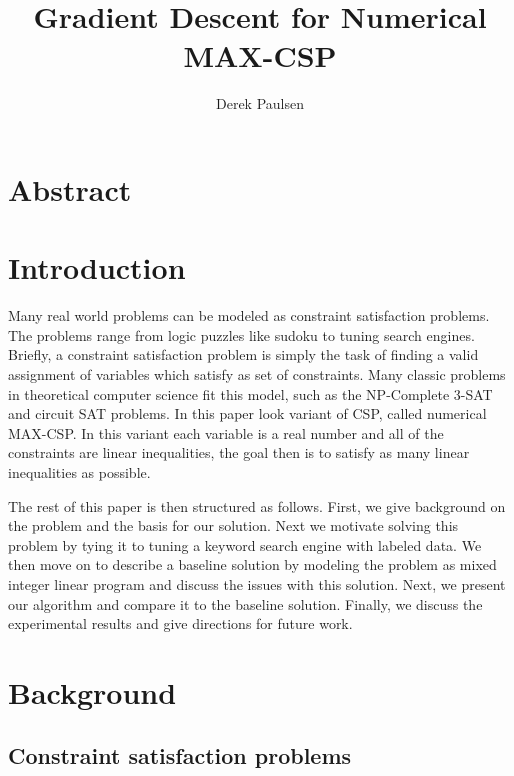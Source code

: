 \documentclass[a4paper]{article}
\title{Gradient Descent for Numerical MAX-CSP} %
\author{
Derek Paulsen \\
}
\date{}
\begin{document}
\maketitle 


\section{Abstract}
\section{Introduction}


Many real world problems can be modeled as constraint 
satisfaction problems. The problems range from logic puzzles 
like sudoku to tuning search engines. Briefly, a constraint satisfaction 
problem is simply the task of finding a valid assignment of variables 
which satisfy as set of constraints. Many classic problems in theoretical computer 
science fit this model, such as the NP-Complete 3-SAT and circuit SAT problems. In this paper 
look variant of CSP, called numerical MAX-CSP. In this variant each variable is a real number
and all of the constraints are linear inequalities, the goal then is to satisfy as 
many linear inequalities as possible. 

The rest of this paper is then structured as follows. First, we give background on the problem 
and the basis for our solution. Next we motivate solving this problem by tying it to 
tuning a keyword search engine with labeled data. We then move on to describe a baseline 
solution by modeling the problem as mixed integer linear program and discuss the issues with 
this solution. Next, we present our algorithm and compare it to the baseline solution. Finally, 
we discuss the experimental results and give directions for future work.

\section{Background}


\subsection{Constraint satisfaction problems}
\end{document}
